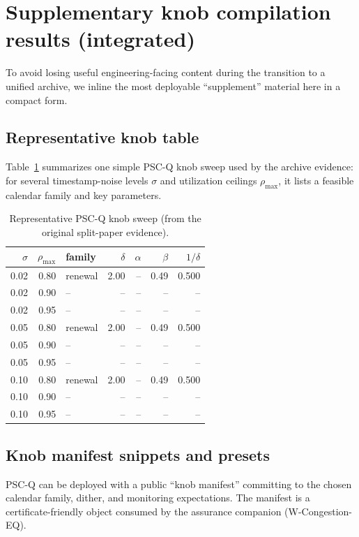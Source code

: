 \documentclass[11pt]{article}
\theoremstyle{definition}
\theoremstyle{remark}
\begin{document}
\section{Supplementary knob compilation results (integrated)}
To avoid losing useful engineering-facing content during the transition to a unified archive,
we inline the most deployable ``supplement'' material here in a compact form.

\subsection{Representative knob table}
Table~\ref{tab:pscq_knobs} summarizes one simple PSC-Q knob sweep used by the archive evidence: for several
timestamp-noise levels $\sigma$ and utilization ceilings $\rho_{\max}$, it lists a feasible calendar family and key parameters.
\begin{table}[h]
\centering
\begin{tabular}{r|r|l|r|r|r|r}
$\sigma$ & $\rho_{\max}$ & family & $\delta$ & $\alpha$ & $\beta$ & $1/\delta$ \\
\hline
0.02 & 0.80 & renewal & 2.00 & -- & 0.49 & 0.500\\
0.02 & 0.90 & -- & -- & -- & -- & --\\
0.02 & 0.95 & -- & -- & -- & -- & --\\
0.05 & 0.80 & renewal & 2.00 & -- & 0.49 & 0.500\\
0.05 & 0.90 & -- & -- & -- & -- & --\\
0.05 & 0.95 & -- & -- & -- & -- & --\\
0.10 & 0.80 & renewal & 2.00 & -- & 0.49 & 0.500\\
0.10 & 0.90 & -- & -- & -- & -- & --\\
0.10 & 0.95 & -- & -- & -- & -- & --\\
\end{tabular}
\caption{Representative PSC-Q knob sweep (from the original split-paper evidence).}\label{tab:pscq_knobs}
\end{table}

\subsection{Knob manifest snippets and presets}
PSC-Q can be deployed with a public ``knob manifest'' committing to the chosen calendar family, dither, and
monitoring expectations. The manifest is a certificate-friendly object consumed by the assurance companion (W-Congestion-EQ).
\end{document}
